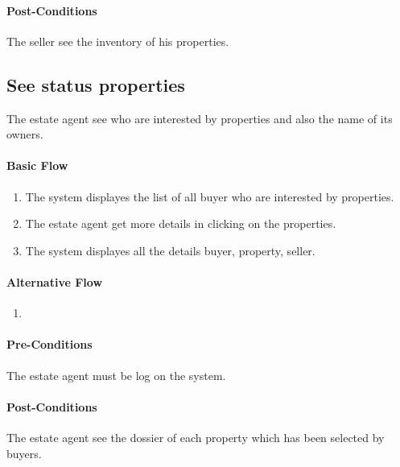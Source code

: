 \documentclass[a4paper,12pt]{article}
\begin{document}
\paragraph{Post-Conditions}
The seller see the inventory of his properties.

\subsection{See status properties}

The estate agent see who are interested by properties and also the name of its owners.

\paragraph{Basic Flow}
\begin{enumerate}
\item The system displayes the list of all buyer who are interested by properties.
\item The estate agent get more details in clicking on the properties.
\item The system displayes all the details buyer, property, seller.
\end{enumerate}
\paragraph{Alternative Flow}
\begin{enumerate}
\item
\end{enumerate}
\paragraph{Pre-Conditions}
The estate agent must be log on the system.
\paragraph{Post-Conditions}
The estate agent see the dossier of each property which has been selected by buyers.
\end{document}
